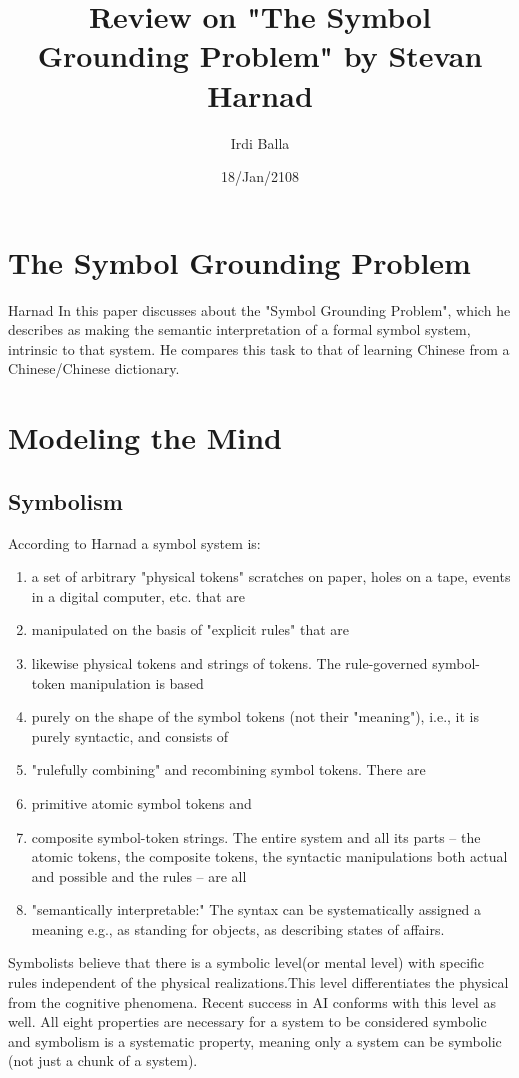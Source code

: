 \documentclass{article}
\title{Review on "The Symbol Grounding Problem" by Stevan Harnad}
\date{18/Jan/2108}
\author{Irdi Balla}
\begin{document}
	\maketitle	
	\section{The Symbol Grounding Problem}
	Harnad In this paper discusses about the "Symbol Grounding Problem", which he describes as making the semantic interpretation of a formal symbol system, intrinsic to that system. He compares this task to that of learning Chinese from a Chinese/Chinese dictionary.
	\section{Modeling the Mind}
	\subsection{Symbolism}
	According to Harnad a symbol system is:
	\begin{enumerate}
		\item a set of arbitrary "physical tokens" scratches on paper, holes on a tape, events in a digital computer, etc. that are
		\item manipulated on the basis of "explicit rules" that are
		\item likewise physical tokens and strings of tokens. The rule-governed symbol-token manipulation is based
		\item purely on the shape of the symbol tokens (not their "meaning"), i.e., it is purely syntactic, and consists of
		\item "rulefully combining" and recombining symbol tokens. There are
		\item primitive atomic symbol tokens and
		\item composite symbol-token strings. The entire system and all its parts -- the atomic tokens, the composite tokens, the syntactic manipulations both actual and possible and the rules -- are all
		\item "semantically interpretable:" The syntax can be systematically assigned a meaning e.g., as standing for objects, as describing states of affairs.
	\end{enumerate}
	Symbolists believe that there is a symbolic level(or mental level) with specific rules independent of the physical realizations.This level differentiates the physical from the cognitive phenomena. Recent success in AI conforms with this level as well. All eight properties are necessary for a system to be considered symbolic and symbolism is a systematic property, meaning only a system can be symbolic (not just a chunk of a system).
\end{document}

